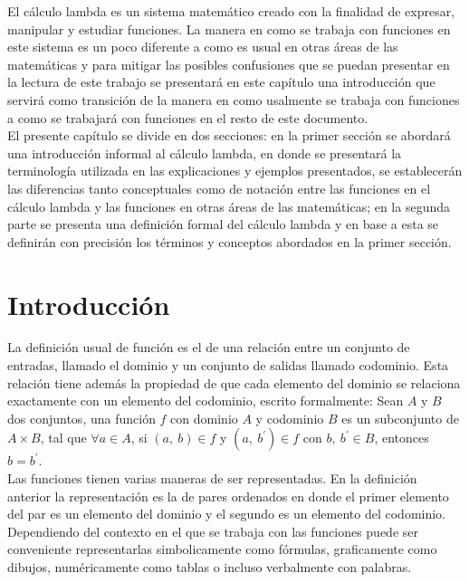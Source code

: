 El cálculo lambda es un sistema matemático creado con la finalidad de expresar,
manipular y estudiar funciones. La manera en como se trabaja con funciones en
este sistema es un poco diferente a como es usual en otras áreas de
las matemáticas y para mitigar las posibles confusiones que se puedan presentar
en la lectura de este trabajo se presentará en este capítulo una introducción
que servirá como transición de la manera en como usalmente se trabaja con
funciones a como se trabajará con funciones en el resto de este documento.\\

El presente capítulo se divide en dos secciones: en la primer sección se
abordará una introducción informal al cálculo lambda, en donde se presentará la
terminología utilizada en las explicaciones y ejemplos presentados, se
establecerán las diferencias tanto conceptuales como de notación entre las
funciones en el cálculo lambda y las funciones en otras áreas de las
matemáticas; en la segunda parte se presenta una definición formal del cálculo
lambda y en base a esta se definirán con precisión los términos y conceptos
abordados en la primer sección.

\section{Introducción}

La definición usual de función es el de una relación entre un conjunto de
entradas, llamado el dominio y un conjunto de salidas llamado codominio. Esta
relación tiene además la propiedad de que cada elemento del dominio se relaciona
exactamente con un elemento del codominio, escrito formalmente: Sean
\(A\) y \(B\) dos conjuntos, una función \(f\) con dominio \(A\) y codominio
\(B\) es un subconjunto de \(A\times B\), tal que \(\forall a \in A\), si \((a,\
b) \in f\) y \((a,\ b^\prime) \in f\) con \(b,\ b^\prime \in B\), entonces
\(b=b^\prime\).\\

Las funciones tienen varias maneras de ser representadas. En la
definición anterior la representación es la de pares ordenados en donde el
primer elemento del par es un elemento del dominio y el segundo es un elemento
del codominio. Dependiendo del contexto en el que se trabaja con las funciones
puede ser conveniente representarlas simbolicamente como fórmulas, graficamente
como dibujos, numéricamente como tablas o incluso verbalmente con palabras.\\

